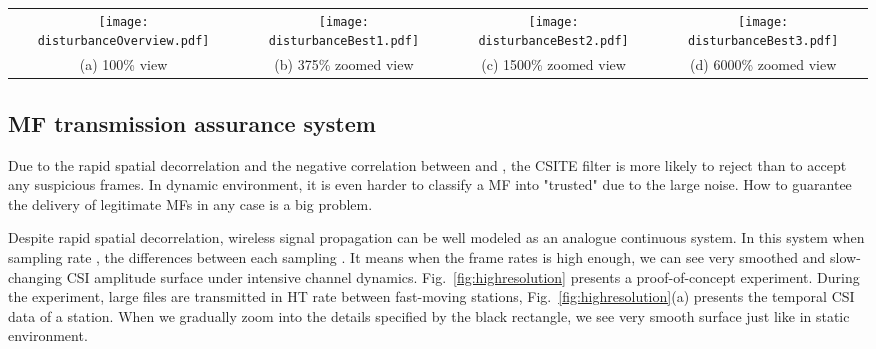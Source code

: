 \documentclass[conference]{IEEEtran}
\begin{document}
\begin{figure*}[!t]
\begin{center}
\begin{tabular}{cccc}
\hspace{-0.1in}
\texttt{[image: disturbanceOverview.pdf]} \hspace{-0.1in} &
\texttt{[image: disturbanceBest1.pdf]} \hspace{-0.15in} &
\texttt{[image: disturbanceBest2.pdf]} \hspace{-0.15in} &
\texttt{[image: disturbanceBest3.pdf]} \\
(a) 100\% view & (b) 375\% zoomed view & (c) 1500\% zoomed view & (d) 6000\% zoomed view
\end{tabular}
\end{center}
\caption{(a). Original view of CSI under highly dynamic
  environment. (b), (c), and (d) provide gradually zoomed views for the details circled by black box. }

\label{fig:highresolution}
\vspace{-0.1in}
\end{figure*}


\subsection{MF transmission assurance system}
\label{subsec:assurance}

Due to the rapid spatial decorrelation and the negative correlation
between  and ,
the CSITE filter is more likely to reject than to accept any suspicious frames.
In dynamic environment, it is even harder to classify a MF into "trusted" due to the large noise.
How to guarantee the delivery of legitimate MFs in any case is a big problem.

Despite rapid spatial decorrelation, wireless signal propagation can be well modeled as
an analogue continuous system. In this system when sampling rate , the differences between each sampling .
It means when the frame rates is high enough, we can see very smoothed and slow-changing CSI amplitude surface under intensive channel dynamics.
Fig.~\ref{fig:highresolution} presents a proof-of-concept experiment.
During the experiment, large files are transmitted in HT rate between fast-moving stations, Fig.~\ref{fig:highresolution}(a) presents the temporal CSI data of a station. When
 we gradually zoom into the details specified by the black rectangle, we
 see very smooth surface just like in static environment.
\end{document}
